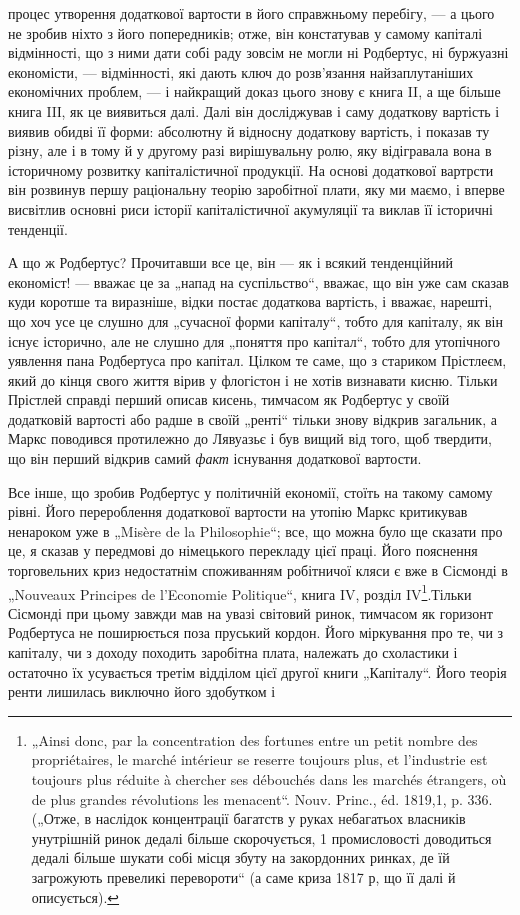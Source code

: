 \parcont{}  %
процес утворення додаткової вартости в його справжньому перебігу, — а
цього не зробив ніхто з його попередників; отже, він констатував у
самому капіталі відмінності, що з ними дати собі раду зовсім не могли
ні Родбертус, ні буржуазні економісти, — відмінності, які дають ключ до
розв’язання найзаплутаніших економічних проблем, — і найкращий доказ
цього знову є книга II, а ще більше книга IIІ, як це виявиться далі.
Далі він досліджував і саму додаткову вартість і виявив обидві її форми:
абсолютну й відносну додаткову вартість, і показав ту різну, але і в
тому й у другому разі вирішувальну ролю, яку відігравала вона в історичному
розвитку капіталістичної продукції. На основі додаткової вартрсти
він розвинув першу раціональну теорію заробітної плати, яку ми
маємо, і вперве висвітлив основні риси історії капіталістичної акумуляції
та виклав її історичні тенденції.

А що ж Родбертус? Прочитавши все це, він — як і всякий тенденційний
економіст! — вважає це за „напад на суспільство“, вважає, що він уже сам
сказав куди коротше та виразніше, відки постає додаткова вартість, і
вважає, нарешті, що хоч усе це слушно для „сучасної форми капіталу“,
тобто для капіталу, як він існує історично, але не слушно для „поняття
про капітал“, тобто для утопічного уявлення пана Родбертуса про капітал.
Цілком те саме, що з стариком Прістлеєм, який до кінця свого
життя вірив у флогістон і не хотів визнавати кисню. Тільки Прістлей
справді перший описав кисень, тимчасом як Родбертус у своїй додатковій
вартості або радше в своїй „ренті“ тільки знову відкрив загальник,
а Маркс поводився протилежно до Лявуазьє і був вищий від того, щоб
твердити, що він перший відкрив самий \emph{факт} існування додаткової
вартости.

Все інше, що зробив Родбертус у політичній економії, стоїть на
такому самому рівні. Його перероблення додаткової вартости на утопію
Маркс критикував ненароком уже в „Misère de la Philosophie“;
все, що можна було ще сказати про це, я сказав у передмові до німецького
перекладу цієї праці. Його пояснення торговельних криз недостатнім
споживанням робітничої кляси є вже в Сісмонді в „Nouveaux Principes
de l’Economie Politique“, книга IV, розділ IV\footnote{
„Ainsi donc, par la concentration des fortunes entre un petit nombre des propriétaires,
le marché intérieur se reserre toujours plus, et l'industrie est toujours plus
réduite à chercher ses débouchés dans les marchés étrangers, où de plus grandes révolutions
les menacent“. Nouv. Princ., éd. 1819,1, p. 336. („Отже, в наслідок концентрації
багатств у руках небагатьох власників унутрішній ринок дедалі більше
скорочується, 1 промисловості доводиться дедалі більше шукати собі місця збуту
на закордонних ринках, де їй загрожують превеликі перевороти“ (а саме криза
1817 р, що її далі й описується).
}.Тільки Сісмонді
при цьому завжди мав на увазі світовий ринок, тимчасом як горизонт
Родбертуса не поширюється поза пруський кордон. Його міркування про
те, чи з капіталу, чи з доходу походить заробітна плата, належать до
схоластики і остаточно їх усувається третім відділом цієї другої книги
„Капіталу“. Його теорія ренти лишилась виключно його здобутком і
\parbreak{}  %
